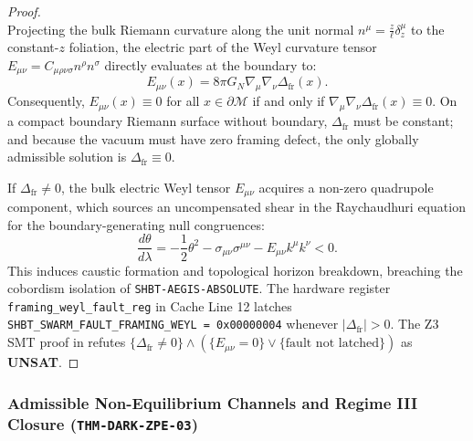 \documentclass[11pt,onecolumn]{article}
\begin{document}
\begin{proof}
\begin{equation}
\end{equation}
Projecting the bulk Riemann curvature along the unit normal $n^\mu = \frac{z}{\ell} \delta_z^\mu$ to the constant-$z$ foliation, the electric part of the Weyl curvature tensor $E_{\mu\nu} = C_{\mu\rho\nu\sigma} n^\rho n^\sigma$ directly evaluates at the boundary to:
\begin{equation}
E_{\mu\nu}(x) = 8\pi G_N \nabla_\mu \nabla_\nu \Delta_{\text{fr}}(x).
\end{equation}
Consequently, $E_{\mu\nu}(x) \equiv 0$ for all $x \in \partial\mathcal{M}$ if and only if $\nabla_\mu\nabla_\nu \Delta_{\text{fr}}(x) \equiv 0$. On a compact boundary Riemann surface without boundary, $\Delta_{\text{fr}}$ must be constant; and because the vacuum must have zero framing defect, the only globally admissible solution is $\Delta_{\text{fr}} \equiv 0$.

If $\Delta_{\text{fr}} \neq 0$, the bulk electric Weyl tensor $E_{\mu\nu}$ acquires a non-zero quadrupole component, which sources an uncompensated shear in the Raychaudhuri equation for the boundary-generating null congruences:
\begin{equation}
\frac{d\theta}{d\lambda} = -\frac{1}{2}\theta^2 - \sigma_{\mu\nu}\sigma^{\mu\nu} - E_{\mu\nu} k^\mu k^\nu < 0.
\end{equation}
This induces caustic formation and topological horizon breakdown, breaching the cobordism isolation of \texttt{SHBT-AEGIS-ABSOLUTE}. The hardware register \texttt{framing\_weyl\_fault\_reg} in Cache Line 12 latches \texttt{SHBT\_SWARM\_FAULT\_FRAMING\_WEYL = 0x00000004} whenever $|\Delta_{\text{fr}}| > 0$. The Z3 SMT proof in  refutes $\{\Delta_{\text{fr}} \neq 0\} \wedge (\{E_{\mu\nu} = 0\} \vee \{\text{fault not latched}\})$ as \textbf{UNSAT}.
\end{proof}

\subsubsection{Admissible Non-Equilibrium Channels and Regime III Closure (\texttt{THM-DARK-ZPE-03})}
\label{subsubsec:thm_dark_zpe_03}
\end{document}
